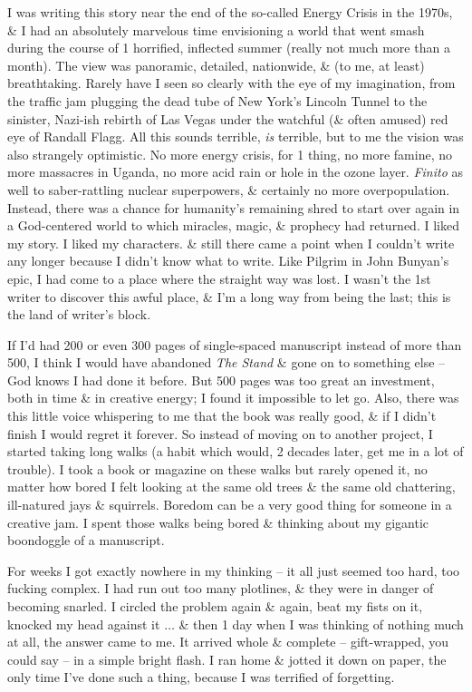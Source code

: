\documentclass{article}
\numberwithin{equation}{section}
\begin{document}
I was writing this story near the end of the so-called Energy Crisis in the 1970s, \& I had an absolutely marvelous time envisioning a world that went smash during the course of 1 horrified, inflected summer (really not much more than a month). The view was panoramic, detailed, nationwide, \& (to me, at least) breathtaking. Rarely have I seen so clearly with the eye of my imagination, from the traffic jam plugging the dead tube of New York's Lincoln Tunnel to the sinister, Nazi-ish rebirth of Las Vegas under the watchful (\& often amused) red eye of Randall Flagg. All this sounds terrible, \textit{is} terrible, but to me the vision was also strangely optimistic. No more energy crisis, for 1 thing, no more famine, no more massacres in Uganda, no more acid rain or hole in the ozone layer. \textit{Finito} as well to saber-rattling nuclear superpowers, \& certainly no more overpopulation. Instead, there was a chance for humanity's remaining shred to start over again in a God-centered world to which miracles, magic, \& prophecy had returned. I liked my story. I liked my characters. \& still there came a point when I couldn't write any longer because I didn't know what to write. Like Pilgrim in John Bunyan's epic, I had come to a place where the straight way was lost. I wasn't the 1st writer to discover this awful place, \& I'm a long way from being the last; this is the land of writer's block.

If I'd had 200 or even 300 pages of single-spaced manuscript instead of more than 500, I think I would have abandoned \textit{The Stand} \& gone on to something else -- God knows I had done it before. But 500 pages was too great an investment, both in time \& in creative energy; I found it impossible to let go. Also, there was this little voice whispering to me that the book was really good, \& if I didn't finish I would regret it forever. So instead of moving on to another project, I started taking long walks (a habit which would, 2 decades later, get me in a lot of trouble). I took a book or magazine on these walks but rarely opened it, no matter how bored I felt looking at the same old trees \& the same old chattering, ill-natured jays \& squirrels. Boredom can be a very good thing for someone in a creative jam. I spent those walks being bored \& thinking about my gigantic boondoggle of a manuscript.

For weeks I got exactly nowhere in my thinking -- it all just seemed too hard, too fucking complex. I had run out too many plotlines, \& they were in danger of becoming snarled. I circled the problem again \& again, beat my fists on it, knocked my head against it $\ldots$ \& then 1 day when I was thinking of nothing much at all, the answer came to me. It arrived whole \& complete -- gift-wrapped, you could say -- in a simple bright flash. I ran home \& jotted it down on paper, the only time I've done such a thing, because I was terrified of forgetting.
\end{document}
